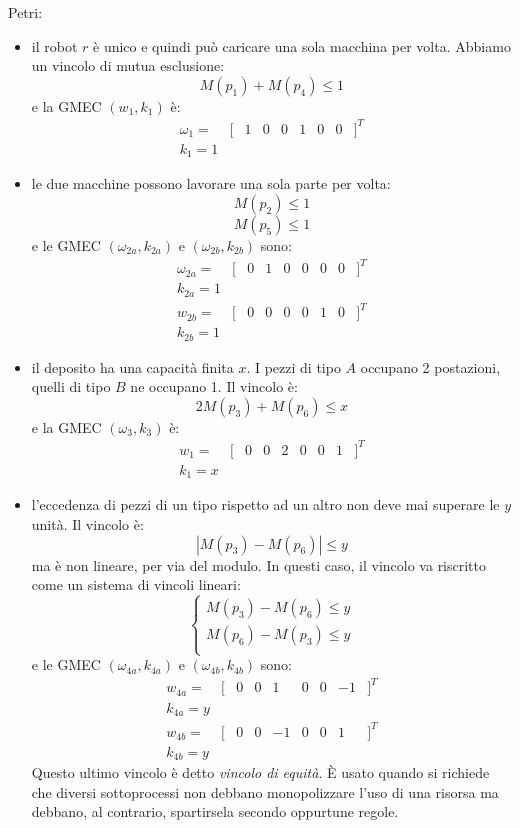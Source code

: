 \documentclass[a4paper]{report}
\begin{document}
Petri:
\begin{itemize}
\item il robot $r$ \`e unico e quindi pu\`o caricare una sola macchina
  per volta. Abbiamo un vincolo di mutua esclusione:
  \[
  M(p_1) + M(p_4) \leq 1
  \]
  e la GMEC $(w_1, k_1)$ \`e:
  \[
  \begin{array}{ccccccccc}
    \omega_1 = & [ & 1 & 0 & 0 & 1 & 0 & 0 & ]^T\\
    k_1 = 1
  \end{array}
  \]
\item le due macchine possono lavorare una sola parte per volta:
  \[
  M(p_2) \leq 1
  \]
  \[
  M(p_5) \leq 1
  \]
  e le GMEC $(\omega_{2a}, k_{2a})$ e $(\omega_{2b}, k_{2b})$ sono:
  \[
  \begin{array}{ccccccccc}
    \omega_{2a} = & [ & 0 & 1 & 0 & 0 & 0 & 0 & ]^T\\
    k_{2a} = 1\\
    w_{2b} = & [ & 0 & 0 & 0 & 0 & 1 & 0 & ]^T\\
    k_{2b} = 1
  \end{array}
  \]
\item il deposito ha una capacit\`a finita $x$. I pezzi di tipo $A$
  occupano 2 postazioni, quelli di tipo $B$ ne occupano 1. Il vincolo
  \`e:
  \[
  2M(p_3) + M(p_6) \leq x
  \]
  e la GMEC $(\omega_3, k_3)$ \`e:
  \[
  \begin{array}{ccccccccc}
    w_1 = & [ & 0 & 0 & 2 & 0 & 0 & 1 & ]^T\\
    k_1 = x
  \end{array}
  \]
\item l'eccedenza di pezzi di un tipo rispetto ad un altro non deve
  mai superare le $y$ unit\`a. Il vincolo \`e:
  \[
  |M(p_3) - M(p_6)| \leq y
  \]
  ma \`e non lineare, per via del modulo. In questi caso, il vincolo
  va riscritto come un sistema di vincoli lineari:
  \[
  \left \{
  \begin{array}{l}
  M(p_3) - M(p_6) \leq y\\
  M(p_6) - M(p_3) \leq y\\
  \end{array}
  \right .
  \]
  e le GMEC $(\omega_{4a}, k_{4a})$ e $(\omega_{4b}, k_{4b})$ sono:
  \[
  \begin{array}{ccccccccc}
    w_{4a} = & [ & 0 & 0 & 1 & 0 & 0 & -1 & ]^T\\
    k_{4a} = y\\
    w_{4b} = & [ & 0 & 0 & -1 & 0 & 0 & 1 & ]^T\\
    k_{4b} = y
  \end{array}
  \]
  Questo ultimo vincolo \`e detto {\em vincolo di
    equit\`a}. \`E usato
  quando si richiede che diversi sottoprocessi non debbano
  monopolizzare l'uso di una risorsa ma debbano, al contrario,
  spartirsela secondo oppurtune regole.
\end{itemize}
\end{document}
